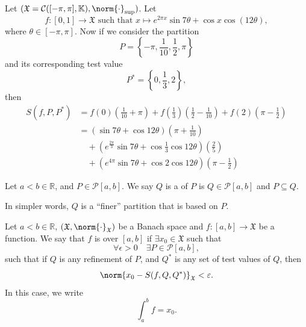 \documentclass[notoc,notitlepage]{tufte-book}
\begin{document}
\begin{eg}
  Let $(\mathfrak{X} = \mathcal{C}([-\pi, \pi], \mathbb{K}),
  \norm{\cdot}_{\sup})$. Let
  \begin{equation*}
    f : [0, 1] \to \mathfrak{X} \text{ such that } x \mapsto e^{2\pi x} \sin
    7 \theta + \cos x \cos (12 \theta),
  \end{equation*}
  where $\theta \in [-\pi, \pi]$. Now if we consider the partition
  \begin{equation*}
    P = \left\{ - \pi, \frac{1}{10}, \frac{1}{2}, \pi \right\}
  \end{equation*}
  and its corresponding test value
  \begin{equation*}
    P^* = \left\{ 0, \frac{1}{3}, 2 \right\},
  \end{equation*}
  then
  \begin{align*}
    S(f, P, P^*)
    &= f(0) \left( \frac{1}{10} + \pi \right)
      + f \left( \frac{1}{3} \right) \left( \frac{1}{2} - \frac{1}{10} \right)
      + f(2) \left( \pi - \frac{1}{2} \right) \\
    &= (\sin 7 \theta + \cos 12 \theta) \left( \pi + \frac{1}{10} \right) \\
    &\quad + \left( e^{\frac{2\pi}{3}} \sin 7\theta +
      \cos\frac{1}{3} \cos 12\theta \right) \left( \frac{2}{5} \right) \\
    &\quad + ( e^{4 \pi} \sin 7\theta + \cos 2 \cos 12\theta ) \left( \pi -
      \frac{1}{2} \right)
  \end{align*}
\end{eg}

\begin{defn}\label{defn:refinement_of_a_partition}
  Let $a < b \in \mathbb{R}$, and $P \in \mathcal{P}[a, b]$. We say $Q$ is a
   of $P$ is $Q \in \mathcal{P}[a, b]$ and $P \subseteq Q$.
\end{defn}

\begin{note}
  In simpler words, $Q$ is a ``finer'' partition that is based on $P$.
\end{note}

\begin{defn}\label{defn:riemann_integrable}
  Let $a < b \in \mathbb{R}$, $(\mathfrak{X}, \norm{\cdot}_{\mathfrak{X}})$ be a
  Banach space and $f : [a, b] \to \mathfrak{X}$ be a function. We say that $f$ 
  is  over $[a, b]$ if $\exists x_0 \in
  \mathfrak{X}$ such that
  \begin{equation*}
    \forall \epsilon > 0 \quad \exists P \in \mathcal{P}[a, b],
  \end{equation*}
  such that if $Q$ is any refinement of $P$, and $Q^*$ is any set of test values
  of $Q$, then
  \begin{equation*}
    \norm{x_0 - S(f, Q, Q^*)}_{\mathfrak{X}} < \epsilon.
  \end{equation*}
  In this case, we write
  \begin{equation*}
    \int_{a}^{b} f = x_0.
  \end{equation*}
\end{defn}
\end{document}

